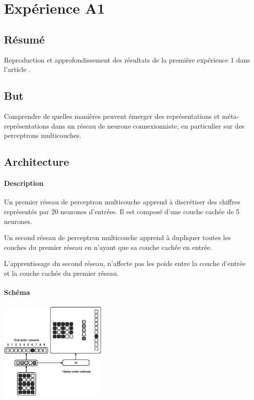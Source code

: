 \section*{Expérience A1} 
  \subsection*{Résumé}
    Reproduction et approfondissement des résultats de la première expérience 1 dans l'article 
    \cite{Cleeremans_2007}. 

  
  \subsection*{But}
    Comprendre de quelles manières peuvent émerger des représentations et méta-représentations dans 
    un réseau de neurone connexionniste, en particulier sur des perceptrons multicouches.
  
  
  \subsection*{Architecture}
    \paragraph*{Description}
      Un premier réseau de perceptron multicouche apprend à discrétiser des chiffres représentés
      par 20 neurones d'entrées. Il est composé d'une couche cachée de 5 neurones.
      
      Un second réseau de perceptron multicouche apprend à dupliquer toutes les couches du premier
      réseau en n'ayant que sa couche cachée en entrée.
      
      L'apprentissage du second réseau, n'affecte pas les poids entre la couche d'entrée et la 
      couche cachée du premier réseau.

    \paragraph*{Schéma}
      \begin{center}
	\includegraphics[width=200px]{../cleeremans_2007/digit_reco/digit_reco2.png}
      \end{center}
      
